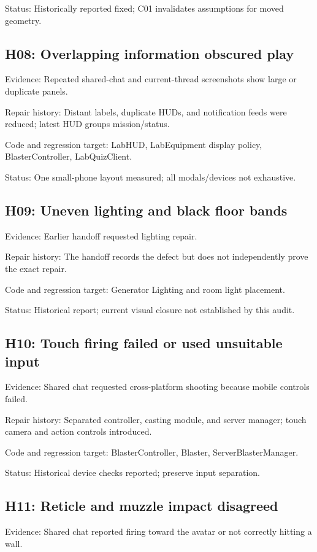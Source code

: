 Status: Historically reported fixed; C01 invalidates assumptions for moved geometry.\allowbreak{}

\subsection{H08: Overlapping information obscured play}
Evidence: Repeated shared-chat and current-thread screenshots show large or duplicate panels.\allowbreak{}

Repair history: Distant labels, duplicate HUDs, and notification feeds were reduced; latest HUD groups mission/\allowbreak{}status.\allowbreak{}

Code and regression target: LabHUD, LabEquipment display policy, BlasterController, LabQuizClient.\allowbreak{}

Status: One small-phone layout measured; all modals/\allowbreak{}devices not exhaustive.\allowbreak{}

\subsection{H09: Uneven lighting and black floor bands}
Evidence: Earlier handoff requested lighting repair.\allowbreak{}

Repair history: The handoff records the defect but does not independently prove the exact repair.\allowbreak{}

Code and regression target: Generator Lighting and room light placement.\allowbreak{}

Status: Historical report; current visual closure not established by this audit.\allowbreak{}

\subsection{H10: Touch firing failed or used unsuitable input}
Evidence: Shared chat requested cross-platform shooting because mobile controls failed.\allowbreak{}

Repair history: Separated controller, casting module, and server manager; touch camera and action controls introduced.\allowbreak{}

Code and regression target: BlasterController, Blaster, ServerBlasterManager.\allowbreak{}

Status: Historical device checks reported; preserve input separation.\allowbreak{}

\subsection{H11: Reticle and muzzle impact disagreed}
Evidence: Shared chat reported firing toward the avatar or not correctly hitting a wall.\allowbreak{}

